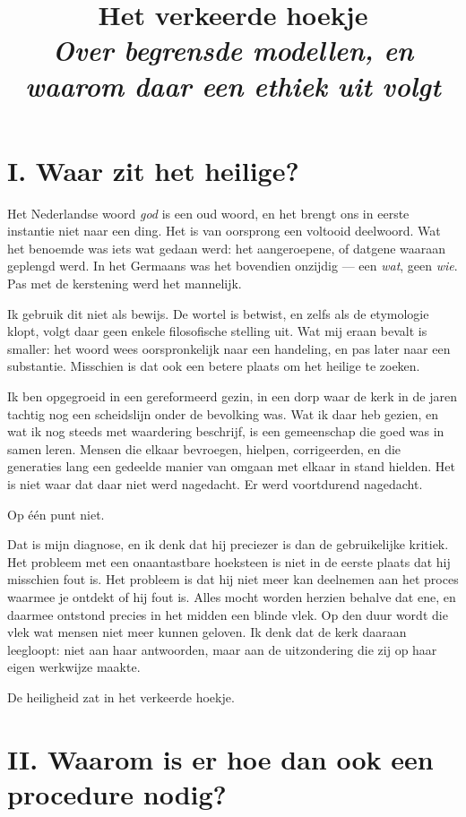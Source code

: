 \documentclass[11pt,a4paper]{article}
\title{\textbf{Het verkeerde hoekje} \\ \large \textit{Over begrensde modellen, en waarom daar een ethiek uit volgt}}
\author{}
\date{}
\begin{document}
\maketitle

\section*{I. Waar zit het heilige?}

Het Nederlandse woord \textit{god} is een oud woord, en het brengt ons in eerste instantie niet naar een ding. Het is van oorsprong een voltooid deelwoord. Wat het benoemde was iets wat gedaan werd: het aangeroepene, of datgene waaraan geplengd werd. In het Germaans was het bovendien onzijdig --- een \textit{wat}, geen \textit{wie}. Pas met de kerstening werd het mannelijk.

Ik gebruik dit niet als bewijs. De wortel is betwist, en zelfs als de etymologie klopt, volgt daar geen enkele filosofische stelling uit. Wat mij eraan bevalt is smaller: het woord wees oorspronkelijk naar een handeling, en pas later naar een substantie. Misschien is dat ook een betere plaats om het heilige te zoeken.

Ik ben opgegroeid in een gereformeerd gezin, in een dorp waar de kerk in de jaren tachtig nog een scheidslijn onder de bevolking was. Wat ik daar heb gezien, en wat ik nog steeds met waardering beschrijf, is een gemeenschap die goed was in samen leren. Mensen die elkaar bevroegen, hielpen, corrigeerden, en die generaties lang een gedeelde manier van omgaan met elkaar in stand hielden. Het is niet waar dat daar niet werd nagedacht. Er werd voortdurend nagedacht.

Op één punt niet.

Dat is mijn diagnose, en ik denk dat hij preciezer is dan de gebruikelijke kritiek. Het probleem met een onaantastbare hoeksteen is niet in de eerste plaats dat hij misschien fout is. Het probleem is dat hij niet meer kan deelnemen aan het proces waarmee je ontdekt of hij fout is. Alles mocht worden herzien behalve dat ene, en daarmee ontstond precies in het midden een blinde vlek. Op den duur wordt die vlek wat mensen niet meer kunnen geloven. Ik denk dat de kerk daaraan leegloopt: niet aan haar antwoorden, maar aan de uitzondering die zij op haar eigen werkwijze maakte.

De heiligheid zat in het verkeerde hoekje.

\section*{II. Waarom is er hoe dan ook een procedure nodig?}
\end{document}
